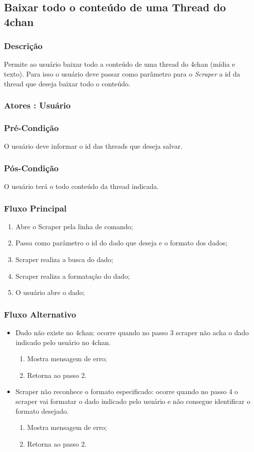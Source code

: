 \subsection{Baixar todo o conteúdo de uma Thread do 4chan}
\subsubsection{Descrição}
Permite ao usuário baixar todo a conteúdo de uma thread do 4chan (mídia e texto). Para isso o usuário deve passar como parâmetro para o \textit{Scraper} a id da thread que deseja baixar todo o conteúdo.
\subsubsection{Atores : Usuário}
\subsubsection{Pré-Condição}
O usuário deve informar o id das threads que deseja salvar.
\subsubsection{Pós-Condição}
O usuário terá o todo conteúdo da thread indicada.
\subsubsection{Fluxo Principal}
\begin{enumerate}
    \item Abre o Scraper pela linha de comando;
    \item Passa como parâmetro o id do dado que deseja e o formato dos dados;
    \item Scraper realiza a busca do dado;
    \item Scraper realiza a formatação do dado;
    \item O usuário abre o dado;
\end{enumerate}
\subsubsection{Fluxo Alternativo}
\begin{itemize}
    \item Dado não existe no 4chan: ocorre quando no passo 3 scraper não acha o dado indicado pelo usuário no 4chan.
    \begin{enumerate}
        \item Mostra mensagem de erro;
        \item Retorna ao passo 2.
    \end{enumerate}
    \item Scraper não reconhece o formato especificado: ocorre quando no passo 4 o scraper vai formatar o dado indicado pelo usuário e não consegue identificar o formato desejado.
    \begin{enumerate}
        \item Mostra mensagem de erro;
        \item Retorna ao passo 2.
    \end{enumerate}
\end{itemize}


